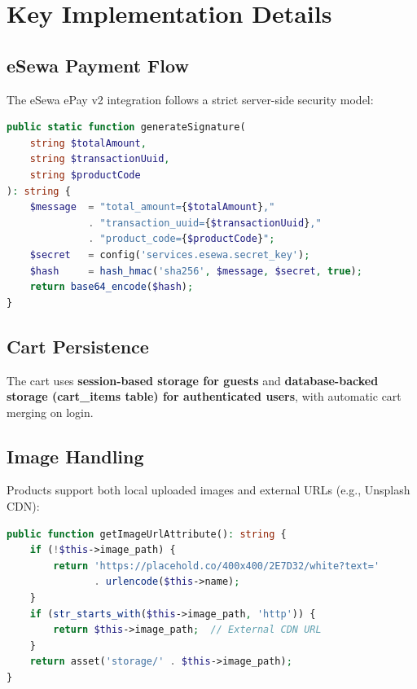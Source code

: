 \documentclass[12pt,a4paper]{report}
\begin{document}
\section{Key Implementation Details}

\subsection{eSewa Payment Flow}

The eSewa ePay v2 integration follows a strict server-side security model:

\begin{lstlisting}[language=php, caption={eSewa HMAC-SHA256 Signature Generation (EsewaHelper.php)}]
public static function generateSignature(
    string $totalAmount,
    string $transactionUuid,
    string $productCode
): string {
    $message  = "total_amount={$totalAmount},"
              . "transaction_uuid={$transactionUuid},"
              . "product_code={$productCode}";
    $secret   = config('services.esewa.secret_key');
    $hash     = hash_hmac('sha256', $message, $secret, true);
    return base64_encode($hash);
}
\end{lstlisting}

\subsection{Cart Persistence}

The cart uses \textbf{session-based storage for guests} and \textbf{database-backed storage (cart\_items table) for authenticated users}, with automatic cart merging on login.

\subsection{Image Handling}

Products support both local uploaded images and external URLs (e.g., Unsplash CDN):

\begin{lstlisting}[language=php, caption={Product::getImageUrlAttribute()}]
public function getImageUrlAttribute(): string {
    if (!$this->image_path) {
        return 'https://placehold.co/400x400/2E7D32/white?text='
               . urlencode($this->name);
    }
    if (str_starts_with($this->image_path, 'http')) {
        return $this->image_path;  // External CDN URL
    }
    return asset('storage/' . $this->image_path);
}
\end{lstlisting}
\end{document}
